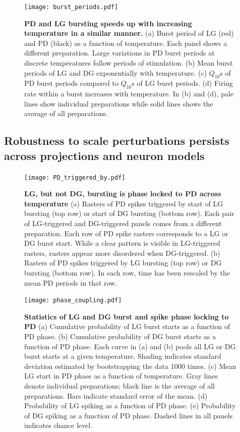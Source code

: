 \documentclass[9pt,lineno]{elife}
\begin{document}
\begin{figure}[!hbp]
\centering
\begin{fullwidth}
\texttt{[image: burst\_periods.pdf]}
\end{fullwidth}
\caption{\textbf{PD and LG bursting speeds up with increasing temperature in a similar manner.} (a) Burst period of  LG (red) and PD (black) as a function of temperature. Each panel shows a different preparation. Large variations in PD burst periods at discrete temperatures follow periods of stimulation. (b) Mean burst periods of LG and DG exponentially with temperature. (c) $Q_{10}$s of PD burst periods compared to $Q_{10}$s of LG burst periods. (d) Firing rate within a burst increases with temperature. In (b) and (d), pale lines show individual preparations while solid lines shows the average of all preparations. }
\end{figure}

\lipsum[3-5]

\subsection{Robustness to scale perturbations persists across projections and neuron models}

\begin{figure}[!hbp]
\centering
\begin{fullwidth}
\texttt{[image: PD\_triggered\_by.pdf]}
\end{fullwidth}
\caption{\textbf{LG, but not DG, bursting is phase locked to PD across temperature} (a) Rasters of PD spikes triggered by start of LG bursting (top row) or start of DG bursting (bottom row). Each pair of LG-triggered and DG-triggered panels comes from a different preparation. Each row of PD spike rasters corresponds to a LG or DG burst start. While a clear pattern is visible in LG-triggered rasters, rasters appear more disordered when DG-triggered. (b) Rasters of PD spikes triggered by LG bursting (top row) or DG bursting (bottom row). In each row, time has been rescaled by the mean PD periods in that row.}
\end{figure}

\lipsum[2-4]

\begin{figure}[!htp]
\centering
\begin{fullwidth}
\texttt{[image: phase\_coupling.pdf]}
\end{fullwidth}
\caption{\textbf{Statistics of LG and DG burst and spike phase locking to PD} (a) Cumulative probability of LG burst starts as a function of PD phase.  (b) Cumulative probability of DG burst starts as a function of PD phase. Each curve in (a) and (b) pools all LG or DG burst starts at a given temperature. Shading indicates standard deviation estimated by bootstrapping the data 1000 times.  (c) Mean LG start in PD phase as a function of temperature. Gray lines denote individual preparations; black line is the average of all preparations. Bars indicate standard error of the mean. (d) Probability of LG spiking as a function of PD phase. (e) Probability of DG spiking as a function of PD phase.  Dashed lines in all panels indicates chance level.}
\end{figure}
\end{document}
